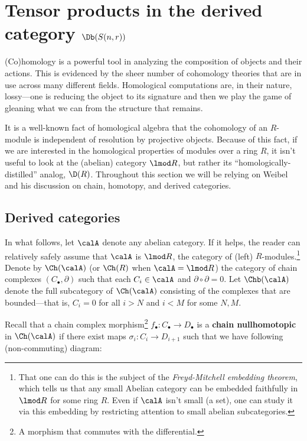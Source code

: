 \documentclass[12pt]{article}
\begin{document}
\section{Tensor products in the derived category \texorpdfstring{$\Db(S(n,r))$}{DbS(n,r)}}
(Co)homology is a powerful tool in analyzing the composition of objects and their actions. This is evidenced 
by the sheer number of cohomology theories that are in use across many different fields. Homological computations are, 
in their nature, lossy---one is reducing the object to its signature and then we play the game of gleaning what we can 
from the structure that remains. 

It is a well-known fact of homological algebra that the cohomology of an $R$-module is independent of 
resolution by projective objects. Because of this fact, if we are interested in the homological properties of modules over a ring $R$,
it isn't useful to look at the (abelian) category $\lmod R$, but rather its ``homologically-distilled'' analog,
$\D(R)$. Throughout this section we will be relying on Weibel \cite{weibel} and his discussion on chain, homotopy, and derived categories.

\subsection{Derived categories}
In what follows, let $\calA$ denote any abelian category. If it helps, the reader can relatively safely assume that $\calA$ is $\lmod R$, the category 
of (left) $R$-modules.\footnote{That one can do this is the subject of the \textit{Freyd-Mitchell embedding theorem}, which tells us that any small Abelian category
can be embedded faithfully in $\lmod R$ for some ring $R$. Even if $\calA$ isn't small (a set), one can study it via this embedding by 
restricting attention to small abelian subcategories.} Denote by $\Ch(\calA)$ (or $\Ch(R)$ when $\calA=\lmod R$) the category of chain complexes $(C_\bullet,\partial)$
such that each $C_i\in\calA$ and $\partial\circ\partial=0$. Let $\Chb(\calA)$ denote the full subcategory of $\Ch(\calA)$ consisting of the 
complexes that are bounded---that is, $C_i=0$ for all $i>N$ and $i<M$ for some $N,M$.

Recall that a chain complex morphism\footnote{A morphism that commutes with the differential.} $f_\bullet:C_\bullet\to D_\bullet$ is a \textbf{chain nullhomotopic} in $\Ch(\calA)$ if
there exist maps $\sigma_i:C_i\to D_{i+1}$ such that we have following (non-commuting) diagram:
\begin{figure}[h]
	\centering
\end{figure}
\end{document}
